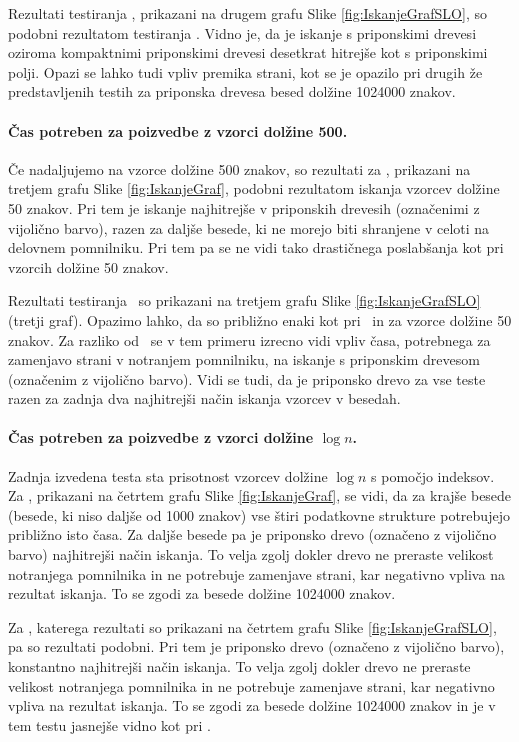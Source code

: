 Rezultati testiranja \NK, prikazani na drugem grafu Slike \ref{fig:IskanjeGrafSLO}, so podobni rezultatom testiranja \DNK. Vidno je, da je iskanje s priponskimi drevesi oziroma kompaktnimi priponskimi drevesi desetkrat hitrejše kot s priponskimi polji. Opazi se lahko tudi vpliv premika strani, kot se je opazilo pri drugih že predstavljenih testih za priponska drevesa besed dolžine 1024000 znakov. 

\paragraph{Čas potreben za poizvedbe z vzorci dolžine 500.}
Če nadaljujemo na vzorce dolžine 500 znakov, so rezultati za \DNK, prikazani na tretjem grafu Slike \ref{fig:IskanjeGraf}, podobni rezultatom iskanja vzorcev dolžine 50 znakov. Pri tem je iskanje najhitrejše v priponskih drevesih (označenimi z vijolično barvo), razen za daljše besede, ki ne morejo biti shranjene v celoti na delovnem pomnilniku. Pri tem pa se ne vidi tako drastičnega poslabšanja kot pri vzorcih dolžine 50 znakov.

Rezultati testiranja \NK\ so prikazani na tretjem grafu Slike \ref{fig:IskanjeGrafSLO} (tretji graf). Opazimo lahko, da so približno enaki kot pri \DNK\ in za vzorce dolžine 50 znakov. Za razliko od \DNK\ se v tem primeru izrecno vidi vpliv časa, potrebnega za zamenjavo strani v notranjem pomnilniku, na iskanje s priponskim drevesom (označenim z vijolično barvo). Vidi se tudi, da je priponsko drevo za vse teste razen za zadnja dva najhitrejši način iskanja vzorcev v besedah.

\paragraph{Čas potreben za poizvedbe z vzorci dolžine $\log{n}$.}
Zadnja izvedena testa sta prisotnost vzorcev dolžine $\log{n}$ s pomočjo indeksov. Za \DNK, prikazani na četrtem grafu Slike \ref{fig:IskanjeGraf}, se vidi, da za krajše besede (besede, ki niso daljše od 1000 znakov) vse štiri podatkovne strukture potrebujejo približno isto časa. Za daljše besede pa je priponsko drevo (označeno z vijolično barvo) najhitrejši način iskanja. To velja zgolj dokler drevo ne preraste velikost notranjega pomnilnika in ne potrebuje zamenjave strani, kar negativno vpliva na rezultat iskanja. To se zgodi za besede dolžine 1024000 znakov.

Za \NK, katerega rezultati so prikazani na četrtem grafu Slike \ref{fig:IskanjeGrafSLO}, pa so rezultati podobni. Pri tem je priponsko drevo (označeno z vijolično barvo), konstantno najhitrejši način iskanja. To velja zgolj dokler drevo ne preraste velikost notranjega pomnilnika in ne potrebuje zamenjave strani, kar negativno vpliva na rezultat iskanja. To se zgodi za besede dolžine 1024000 znakov in  je v tem testu jasnejše vidno kot pri \DNK.
